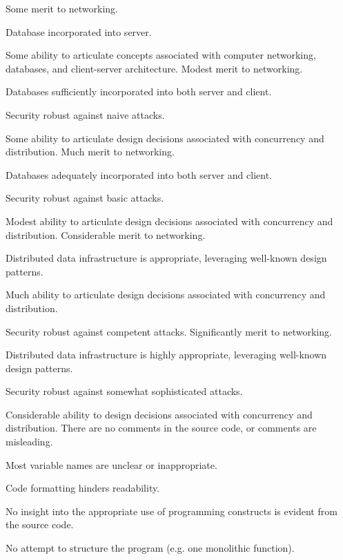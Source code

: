 \documentclass{../../fal_assignment}
\begin{document}
\begin{markingrubric}
        \grade Some merit to networking.
            \par Database incorporated into server.
            \par Some ability to articulate concepts associated with computer networking, databases, and client-server architecture.
        \grade Modest merit to networking.
            \par Databases sufficiently incorporated into both server and client.
            \par Security robust against naive attacks.
            \par Some ability to articulate design decisions associated with concurrency and distribution.
        \grade Much merit to networking.
            \par Databases adequately incorporated into both server and client.
            \par Security robust against basic attacks.
            \par Modest ability to articulate design decisions associated with concurrency and distribution.
        \grade Considerable merit to networking.
            \par Distributed data infrastructure is appropriate, leveraging well-known design patterns.
            \par Much ability to articulate design decisions associated with concurrency and distribution.
            \par Security robust against competent attacks.
        \grade Significantly merit to networking.
            \par Distributed data infrastructure is highly appropriate, leveraging well-known design patterns.
            \par Security robust against somewhat sophisticated attacks.
            \par Considerable ability to design decisions associated with concurrency and distribution.
%
        \grade\fail There are no comments in the source code, or comments are misleading.
            \par Most variable names are unclear or inappropriate.
            \par Code formatting hinders readability.
            \par No insight into the appropriate use of programming constructs is evident from the source code.
            \par No attempt to structure the program (e.g. one monolithic function).

\end{markingrubric}
\end{document}
